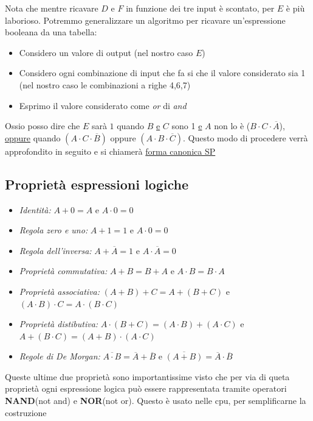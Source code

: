 \vskip3mm
Nota che mentre ricavare $ D $ e $ F $ in funzione dei tre input è scontato, per $ E $ è più laborioso. Potremmo generalizzare un algoritmo per ricavare un'espressione booleana da una tabella:
\begin{itemize}
	\item Considero un valore di output (nel nostro caso $ E $)
	\item Considero ogni combinazione di input che fa si che il valore considerato sia 1 (nel nostro caso le combinazioni a righe 4,6,7)
	\item Esprimo il valore considerato come \textit{or} di \textit{and}
\end{itemize}
Ossio posso dire che $ E $ sarà $ 1 $ quando $ B $ \underline{e} $ C $ sono 1 \underline{e} $ A $ non lo è ($ B \cdot C \cdot \overline{A} $), \underline{oppure} quando $ \left(A \cdot  C \cdot  \overline{B}\right) $ oppure $ \left(A \cdot B \cdot  \overline{C}\right) $. Questo modo di procedere verrà approfondito in seguito e si chiamerà \underline{forma canonica SP}
\subsection{Proprietà espressioni logiche}
\begin{itemize}
	\item \textit{Identità:} $ A + 0 = A $ e $ A \cdot 0 = 0 $
	\item \textit{Regola zero e uno:} $ A + 1 = 1 $ e $ A \cdot 0 = 0 $
	\item \textit{Regola dell'inversa:} $ A + \overline{A} = 1 $ e $ A \cdot \overline{A} = 0 $
	\item \textit{Proprietà commutativa:} $ A + B = B + A $ e $ A \cdot B = B \cdot  A $
	\item \textit{Proprietà associativa:} $ \left(A + B\right) + C  = A + \left(B + C\right)$ e $ \left(A \cdot  B\right) \cdot  C = A \cdot \left(B \cdot  C\right) $
	\item \textit{Proprietà distibutiva:} $ A \cdot  \left(B + C\right) = \left(A \cdot  B\right) + \left(A \cdot  C\right) $ e \underline{$ A + \left( B \cdot  C\right) = \left(A + B\right) \cdot \left(A \cdot C\right) $}
	\item \textit{Regole di De Morgan:} $ \overline{A \cdot  B} = \overline{A} +  \overline{B} $ e $ \overline{\left(A + B\right)} = \overline{A} \cdot  \overline{B} $
\end{itemize}
Queste ultime due proprietà sono importantissime visto che per via di queta proprietà ogni espressione logica può essere rappresentata tramite  operatori \textbf{NAND}(not and) e \textbf{NOR}(not or). Questo è usato nelle cpu, per semplificarne la costruzione
